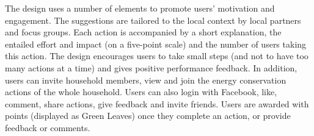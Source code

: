 The design uses a number of elements to promote users' motivation and engagement. 
The suggestions are tailored to the local context by local partners and focus groups. 
Each action is accompanied by a short explanation, the entailed effort and impact (on a five-point scale) and the number of users taking this action. 
The design encourages users to take small steps (and not to have too many actions at a time) and gives positive performance feedback. 
In addition, users can invite household members, %
view and join the energy conservation actions of the whole household. %
Users can also login with Facebook, like, comment, share actions, %
give feedback %
and invite friends. Users are awarded with points  (displayed as Green Leaves) once they complete an action, or provide feedback or comments. 




